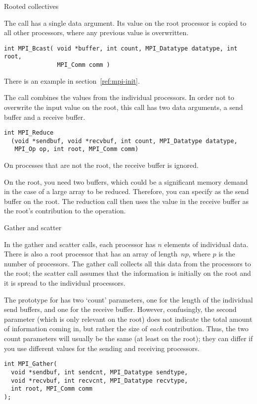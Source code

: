  {Rooted collectives}

The  call has a single data argument. Its
value on the root processor is copied to all other processors,
where any previous value is overwritten.
\begin{verbatim}
int MPI_Bcast( void *buffer, int count, MPI_Datatype datatype, int root, 
               MPI_Comm comm )
\end{verbatim}
There is an example in section~\ref{ref:mpi-init}.

The  call combines the values from the individual
processors. In order not to overwrite the input value on the root, 
this call has two data arguments, a send buffer and a receive buffer.
\begin{verbatim}
int MPI_Reduce
  (void *sendbuf, void *recvbuf, int count, MPI_Datatype datatype, 
   MPI_Op op, int root, MPI_Comm comm)
\end{verbatim}
On processes that are not the root, the receive buffer is ignored. 

On the root, 
you need two buffers, which could be a significant memory demand
in the case of a large array to be reduced.
Therefore, you can specify  as the send
buffer on the root. The reduction call then
uses the value in the receive buffer as the root's contribution to the operation.

 {Gather and scatter}

In the gather and scatter calls, each processor has $n$ elements of individual
data. There is also a root processor that has an array of length~$np$, where $p$
is the number of processors. The gather call collects all this data from the 
processors to the root; the scatter call assumes that the information is 
initially on the root and it is spread to the individual processors.

The prototype for  has two `count' parameters, one
for the length of the individual send buffers, and one for the receive buffer.
However, confusingly, the second parameter (which is only relevant on the root)
does not indicate the total amount of information coming in, but
rather the size of \emph{each} contribution. Thus, the two count parameters
will usually be the same (at least on the root); they can differ if you 
use different  values for the sending and receiving
processors.
\begin{verbatim}
int MPI_Gather(
  void *sendbuf, int sendcnt, MPI_Datatype sendtype,
  void *recvbuf, int recvcnt, MPI_Datatype recvtype,
  int root, MPI_Comm comm
);
\end{verbatim}

